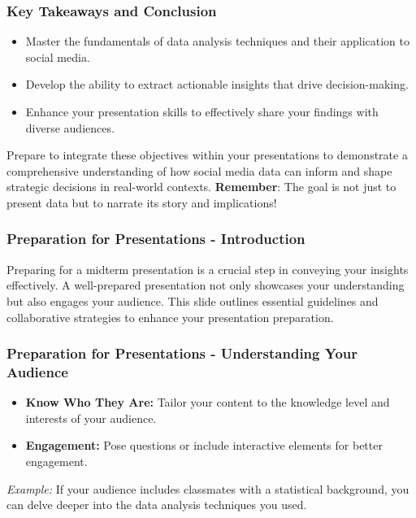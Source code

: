 \documentclass{beamer}
\begin{document}
\begin{frame}[fragile]
    \frametitle{Key Takeaways and Conclusion}
    \begin{itemize}
        \item Master the fundamentals of data analysis techniques and their application to social media.
        \item Develop the ability to extract actionable insights that drive decision-making.
        \item Enhance your presentation skills to effectively share your findings with diverse audiences.
    \end{itemize}
    Prepare to integrate these objectives within your presentations to demonstrate a comprehensive understanding of how social media data can inform and shape strategic decisions in real-world contexts. 
    \textbf{Remember}: The goal is not just to present data but to narrate its story and implications!
\end{frame}

\begin{frame}[fragile]
    \frametitle{Preparation for Presentations - Introduction}
    Preparing for a midterm presentation is a crucial step in conveying your insights effectively. A well-prepared presentation not only showcases your understanding but also engages your audience. This slide outlines essential guidelines and collaborative strategies to enhance your presentation preparation.
\end{frame}

\begin{frame}[fragile]
    \frametitle{Preparation for Presentations - Understanding Your Audience}
    \begin{itemize}
        \item \textbf{Know Who They Are:} Tailor your content to the knowledge level and interests of your audience.
        \item \textbf{Engagement:} Pose questions or include interactive elements for better engagement.
    \end{itemize}
    \textit{Example:} If your audience includes classmates with a statistical background, you can delve deeper into the data analysis techniques you used.
\end{frame}
\end{document}
